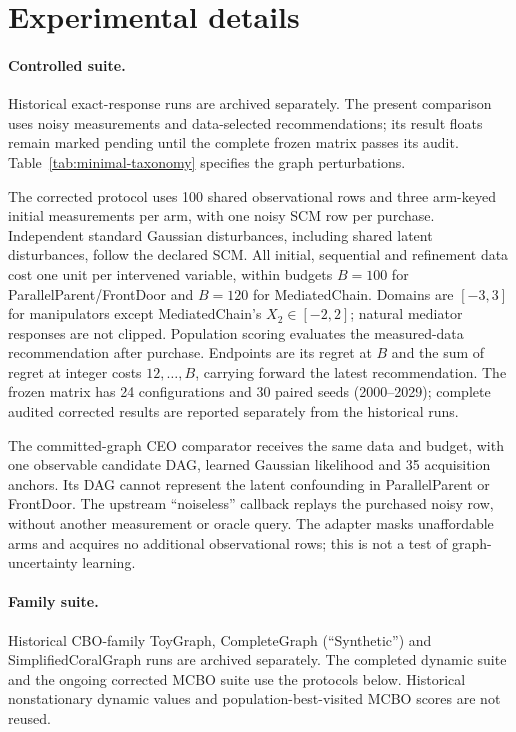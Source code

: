 \documentclass[twoside]{article}
\begin{document}
\section{Experimental details}
\label{app:additional-results}
\paragraph{Controlled suite.} Historical exact-response runs are archived separately. The present comparison uses noisy measurements and data-selected recommendations; its result floats remain marked pending until the complete frozen matrix passes its audit. Table~\ref{tab:minimal-taxonomy} specifies the graph perturbations.

The corrected protocol uses 100 shared observational rows and three arm-keyed initial measurements per arm, with one noisy SCM row per purchase. Independent standard Gaussian disturbances, including shared latent disturbances, follow the declared SCM. All initial, sequential and refinement data cost one unit per intervened variable, within budgets $B=100$ for ParallelParent/FrontDoor and $B=120$ for MediatedChain. Domains are $[-3,3]$ for manipulators except MediatedChain's $X_2\in[-2,2]$; natural mediator responses are not clipped. Population scoring evaluates the measured-data recommendation after purchase. Endpoints are its regret at $B$ and the sum of regret at integer costs $12,\ldots,B$, carrying forward the latest recommendation. The frozen matrix has 24 configurations and 30 paired seeds (2000--2029); complete audited corrected results are reported separately from the historical runs.

The committed-graph CEO comparator receives the same data and budget, with one observable candidate DAG, learned Gaussian likelihood and 35 acquisition anchors. Its DAG cannot represent the latent confounding in ParallelParent or FrontDoor. The upstream ``noiseless'' callback replays the purchased noisy row, without another measurement or oracle query. The adapter masks unaffordable arms and acquires no additional observational rows; this is not a test of graph-uncertainty learning.

\paragraph{Family suite.} Historical CBO-family ToyGraph, CompleteGraph (``Synthetic'') and SimplifiedCoralGraph runs are archived separately. The completed dynamic suite and the ongoing corrected MCBO suite use the protocols below. Historical nonstationary dynamic values and population-best-visited MCBO scores are not reused.
\end{document}

